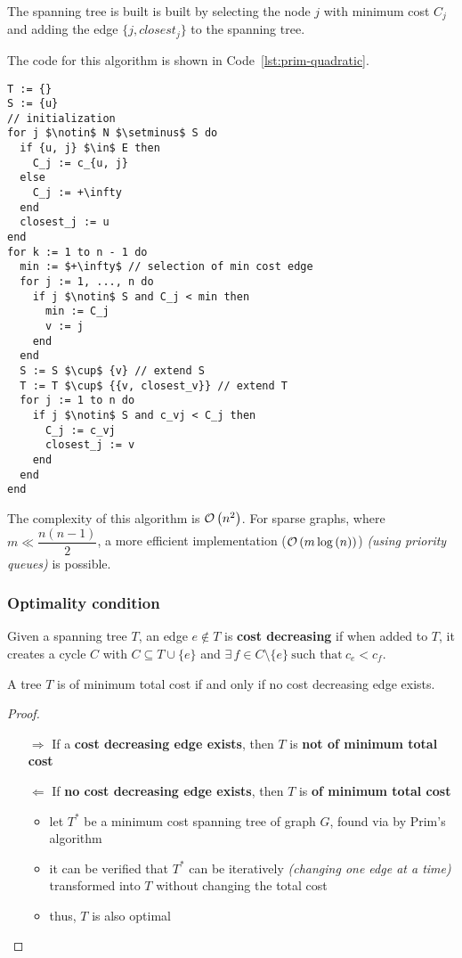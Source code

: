 \documentclass[english]{article}
\begin{document}
The spanning tree is built is built by selecting the node \(j\) with minimum cost \(C_j\) and adding the edge \(\{j, \textit{closest}_j\}\) to the spanning tree.

\bigskip
The code for this algorithm is shown in Code~\ref{lst:prim-quadratic}.

\begin{lstlisting}[style=custom, language=pseudocode, caption={Prim's algorithm in quadratic time}, label={lst:prim-quadratic}, float]
T := {}
S := {u}
// initialization
for j $\notin$ N $\setminus$ S do
  if {u, j} $\in$ E then
    C_j := c_{u, j}
  else
    C_j := +\infty
  end
  closest_j := u
end
for k := 1 to n - 1 do
  min := $+\infty$ // selection of min cost edge
  for j := 1, ..., n do
    if j $\notin$ S and C_j < min then
      min := C_j
      v := j
    end
  end
  S := S $\cup$ {v} // extend S
  T := T $\cup$ {{v, closest_v}} // extend T
  for j := 1 to n do
    if j $\notin$ S and c_vj < C_j then
      C_j := c_vj
      closest_j := v
    end
  end
end
\end{lstlisting}

\bigskip
The complexity of this algorithm is \(\mathcal{O}\left(n^2\right)\).
For sparse graphs, where \(m \ll \dfrac{n(n-1)}{2}\), a more efficient implementation (\(\mathcal{O}\left(m \log{(n)}\right)\)) \textit{(using priority queues)} is possible.

\subsubsection{Optimality condition}

Given a spanning tree \(T\), an edge \(e \notin T\) is \textbf{cost decreasing} if when added to \(T\), it creates a cycle \(C\) with \(C \subseteq T \cup \{e\}\) and \(\exists \, f \in C \setminus \{e\} \ \text{such that} \  c_e < c_f\).

\begin{theorem}
  A tree \(T\) is of minimum total cost if and only if no cost decreasing edge exists.
\end{theorem}

\begin{proof}
  \hfill
  \begin{itemize}
    \item[\(\Rightarrow\)] If a \textbf{cost decreasing edge exists}, then \(T\) is \textbf{not of minimum total cost}
    \item[\(\Leftarrow\)] If \textbf{no cost decreasing edge exists}, then \(T\) is \textbf{of minimum total cost}
      \begin{itemize}
        \item let \(T^\ast\) be a minimum cost spanning tree of graph \(G\), found via by Prim's algorithm
        \item it can be verified that \(T^\ast\) can be iteratively \textit{(changing one edge at a time)} transformed into \(T\) without changing the total cost
        \item thus, \(T\) is also optimal
      \end{itemize}
  \end{itemize}

\end{proof}
\end{document}
